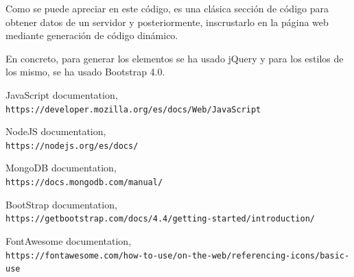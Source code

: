 \documentclass{article}
\begin{document}
Como se puede apreciar en este código, es una clásica sección de código para obtener datos de un servidor y posteriormente, inscrustarlo en la página web mediante generación de código dinámico.

En concreto, para generar los elementos se ha usado jQuery y para los estilos de los mismo, se ha usado Bootstrap 4.0.

\begin{thebibliography}{9}
JavaScript documentation,
\\\texttt{https://developer.mozilla.org/es/docs/Web/JavaScript}

NodeJS documentation,
\\\texttt{https://nodejs.org/es/docs/}

MongoDB documentation,
\\\texttt{https://docs.mongodb.com/manual/}

BootStrap documentation,
\\\texttt{https://getbootstrap.com/docs/4.4/getting-started/introduction/}

FontAwesome documentation,
\\\texttt{https://fontawesome.com/how-to-use/on-the-web/referencing-icons/basic-use}
\end{thebibliography}
\end{document}
